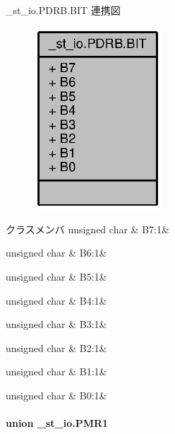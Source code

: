 \+\_\+st\+\_\+io.\+P\+D\+R\+B.\+B\+I\+T 連携図
\nopagebreak
\begin{figure}[H]
\begin{center}
\leavevmode
\includegraphics[width=136pt]{da/dc5/struct__st__io_8PDRB_8BIT__coll__graph}
\end{center}
\end{figure}
\begin{DoxyFields}{クラスメンバ}
unsigned char\label{3694s_8h_ad8498108dd603522047564a8da7be94c}
&
B7\+:1&
\\
\hline

unsigned char\label{3694s_8h_a68b1f1cc15d8987eafe633c9488bdc05}
&
B6\+:1&
\\
\hline

unsigned char\label{3694s_8h_a2a1ab298edf0162a3305e599b47cbeee}
&
B5\+:1&
\\
\hline

unsigned char\label{3694s_8h_ad5d4cc7b09d1843517acc9361f8f665e}
&
B4\+:1&
\\
\hline

unsigned char\label{3694s_8h_a0c4ecd7b59ebc5b9f47974cb9845fd02}
&
B3\+:1&
\\
\hline

unsigned char\label{3694s_8h_abbd97b00c539801e32317ab550867ec4}
&
B2\+:1&
\\
\hline

unsigned char\label{3694s_8h_ac9512565ef6194ca664dc41ec0de7a53}
&
B1\+:1&
\\
\hline

unsigned char\label{3694s_8h_a4c769c2c9989abb9fa024ab9930270e5}
&
B0\+:1&
\\
\hline

\end{DoxyFields}
\label{union__st__io_8PMR1}
\paragraph{union \+\_\+st\+\_\+io.\+P\+M\+R1}



